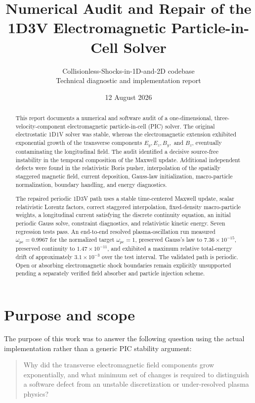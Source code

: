 \documentclass[11pt,a4paper]{article}
\title{Numerical Audit and Repair of the\\
1D3V Electromagnetic Particle-in-Cell Solver}
\author{Collisionless-Shocks-in-1D-and-2D codebase\\
Technical diagnostic and implementation report}
\date{12 August 2026}
\begin{document}
\maketitle

\begin{abstract}
This report documents a numerical and software audit of a one-dimensional,
three-velocity-component electromagnetic particle-in-cell (PIC) solver.  The
original electrostatic 1D1V solver was stable, whereas the electromagnetic
extension exhibited exponential growth of the transverse components
$E_y,E_z,B_y,$ and $B_z$, eventually contaminating the longitudinal field.
The audit identified a decisive source-free instability in the temporal
composition of the Maxwell update.  Additional independent defects were found
in the relativistic Boris pusher, interpolation of the spatially staggered
magnetic field, current deposition, Gauss-law initialization, macro-particle
normalization, boundary handling, and energy diagnostics.

The repaired periodic 1D3V path uses a stable time-centered Maxwell update,
scalar relativistic Lorentz factors, correct staggered interpolation,
fixed-density macro-particle weights, a longitudinal current satisfying the
discrete continuity equation, an initial periodic Gauss solve, constraint
diagnostics, and relativistic kinetic energy.  Seven regression tests pass.
An end-to-end resolved plasma-oscillation run measured
$\omega_{pe}=0.9967$ for the normalized target $\omega_{pe}=1$, preserved
Gauss's law to $7.36\times10^{-15}$, preserved continuity to
$1.47\times10^{-11}$, and exhibited a maximum relative total-energy drift of
approximately $3.1\times10^{-3}$ over the test interval.  The validated path
is periodic.  Open or absorbing electromagnetic shock boundaries remain
explicitly unsupported pending a separately verified field absorber and
particle injection scheme.
\end{abstract}

\tableofcontents
\newpage

\section{Purpose and scope}

The purpose of this work was to answer the following question using the actual
implementation rather than a generic PIC stability argument:

\begin{quote}
Why did the transverse electromagnetic field components grow exponentially,
and what minimum set of changes is required to distinguish a software defect
from an unstable discretization or under-resolved plasma physics?
\end{quote}
\end{document}
